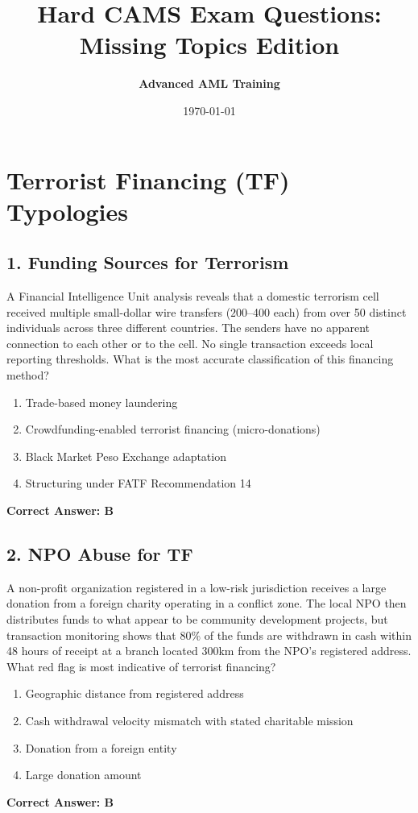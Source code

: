 \documentclass[11pt,a4paper]{article}
\title{\textbf{Hard CAMS Exam Questions: Missing Topics Edition}}
\author{\textbf{Advanced AML Training}}
\date{\today}
\begin{document}
	
	\maketitle
	
	\section{Terrorist Financing (TF) Typologies}
	
	\subsection{1. Funding Sources for Terrorism}
	A Financial Intelligence Unit analysis reveals that a domestic terrorism cell received multiple small-dollar wire transfers ($200–$400 each) from over 50 distinct individuals across three different countries. The senders have no apparent connection to each other or to the cell. No single transaction exceeds local reporting thresholds. What is the most accurate classification of this financing method?
	\begin{enumerate}[label=\Alph*.]
		\item Trade-based money laundering
		\item Crowdfunding-enabled terrorist financing (micro-donations)
		\item Black Market Peso Exchange adaptation
		\item Structuring under FATF Recommendation 14
	\end{enumerate}
	\textbf{Correct Answer: B}
	
	\subsection{2. NPO Abuse for TF}
	A non-profit organization registered in a low-risk jurisdiction receives a large donation from a foreign charity operating in a conflict zone. The local NPO then distributes funds to what appear to be community development projects, but transaction monitoring shows that 80\% of the funds are withdrawn in cash within 48 hours of receipt at a branch located 300km from the NPO's registered address. What red flag is most indicative of terrorist financing?
	\begin{enumerate}[label=\Alph*.]
		\item Geographic distance from registered address
		\item Cash withdrawal velocity mismatch with stated charitable mission
		\item Donation from a foreign entity
		\item Large donation amount
	\end{enumerate}
	\textbf{Correct Answer: B}
	
\end{document}
